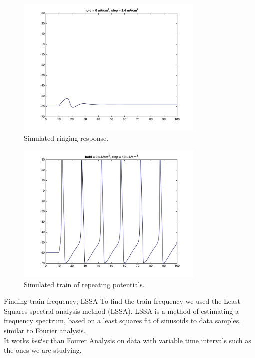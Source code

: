 \documentclass{beamer}
\begin{document}
\begin{frame}
  \begin{figure}
    \centering
    \includegraphics[width = 0.8\textwidth]{./images/current_0_2p4.jpg}
    \caption{Simulated ringing response.}
  \end{figure}
\end{frame}

\begin{frame}
  \begin{figure}
    \centering
    \includegraphics[width = 0.8\textwidth]{./images/current_0_10.jpg}
    \caption{Simulated train of repeating potentials.}
  \end{figure}
\end{frame}

\begin{frame}{Finding train frequency; LSSA}
  To find the train frequency we used the Least-Squares spectral analysis method (LSSA). 
  LSSA is a method of estimating a frequency spectrum, 
based on a least squares fit of sinusoids to data samples, similar to Fourier analysis. \\[0.8cm]
It works \emph{better} than Fourer Analysis on data with variable time intervals such as the ones we are studying.

\end{frame}
\end{document}
